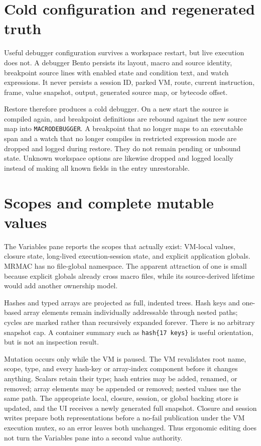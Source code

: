 \documentclass[a4paper,10pt,twoside,openany]{book}
\newcommand{\mrmac}{\textsc{MRMAC}}
\begin{document}
\section{Cold configuration and regenerated truth}

Useful debugger configuration survives a workspace restart, but live execution
does not. A debugger Bento persists its layout, macro and source identity,
breakpoint source lines with enabled state and condition text, and watch
expressions. It never persists a session ID, parked VM, route, current
instruction, frame, value snapshot, output, generated source map, or bytecode
offset.

Restore therefore produces a cold debugger. On a new start the source is
compiled again, and breakpoint definitions are rebound against the new source
map into \texttt{MACRODEBUGGER}. A breakpoint that no longer maps to an
executable span and a watch that no longer compiles in restricted expression
mode are dropped and logged during restore. They do not remain pending or
unbound state. Unknown workspace options are likewise dropped and logged
locally instead of making all known fields in the entry unrestorable.

\section{Scopes and complete mutable values}

The Variables pane reports the scopes that actually exist: VM-local values,
closure state, long-lived execution-session state, and explicit application
globals. \mrmac{} has no file-global namespace. The apparent attraction of
one is small because explicit globals already cross macro files, while its
source-derived lifetime would add another ownership model.

Hashes and typed arrays are projected as full, indented trees. Hash keys and
one-based array elements remain individually addressable through nested
paths; cycles are marked rather than recursively expanded forever. There is no
arbitrary snapshot cap. A container summary such as \texttt{hash\{17 keys\}}
is useful orientation, but is not an inspection result.

Mutation occurs only while the VM is paused. The VM revalidates root name,
scope, type, and every hash-key or array-index component before it changes
anything. Scalars retain their type; hash entries may be added, renamed, or
removed; array elements may be appended or removed; nested values use the
same path. The appropriate local, closure, session, or global backing store is
updated, and the UI receives a newly generated full snapshot. Closure and
session writes prepare both representations before a no-fail publication under
the VM execution mutex, so an error leaves both unchanged. Thus ergonomic
editing does not turn the Variables pane into a second value authority.
\end{document}
